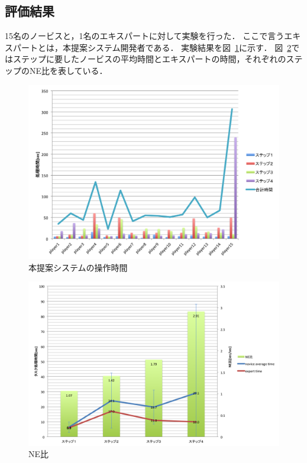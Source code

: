 \documentclass[sotsuron]{kuee}
\begin{document}
		\subsection{評価結果}
			15名のノービスと，1名のエキスパートに対して実験を行った．
			ここで言うエキスパートとは，本提案システム開発者である．
			実験結果を図~\ref{fig:result01}に示す．
			図~\ref{fig:result02}ではステップに要したノービスの平均時間とエキスパートの時間，それぞれのステップのNE比を表している．
			\begin{figure}
				\begin{center}
					\includegraphics[width=\linewidth]{./png/result01.png}
				\end{center}
				\caption{本提案システムの操作時間}
		  		\label{fig:result01}
			\end{figure}
			\begin{figure}
				\begin{center}
					\includegraphics[width=\linewidth]{./png/result02.png}
				\end{center}
				\caption{NE比}
		  		\label{fig:result02}
			\end{figure}
\end{document}
